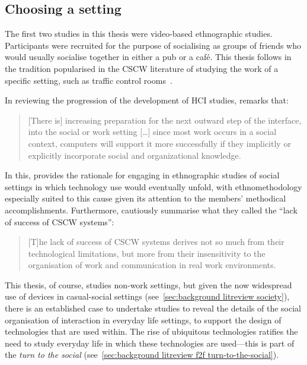 


\subsection{Choosing a setting}\label{sec:synopsis discussion method setting}
\begin{revisedsubmission}
The first two studies in this thesis were video-based ethnographic studies.
Participants were recruited for the purpose of socialising as groups of friends who would usually socialise together in either a pub or a caf\'{e}.
This thesis follows in the tradition popularised in the \ac{CSCW} literature of studying the work of a specific setting, such as traffic control rooms~\citep{Bentley1992}.

In reviewing the progression of the development of \ac{HCI} studies, \citet{Grudin1990} remarks that:

\begin{quote}
    [There is] increasing preparation for the next outward step of the interface, into the social or work setting [\ldots] since most work occurs in a social context, computers will support it more successfully if they implicitly or explicitly incorporate social and organizational knowledge.
\end{quote}
In this, \citet{Grudin1990} provides the rationale for engaging in ethnographic studies of social settings in which technology use would eventually unfold, with ethnomethodology especially suited to this cause given its attention to the members' methodical accomplishments.
Furthermore, \citet{Heath1994} cautiously summarise what they called the ``lack of success of \ac{CSCW} systems'':
\begin{quote}
    [T]he lack of success of \ac{CSCW} systems derives not so much from their technological limitations, but more from their insensitivity to the organisation of work and communication in real work environments.
\end{quote}
This thesis, of course, studies non-work settings, but given the now widespread use of devices in casual-social settings (see~\ref{sec:background litreview society}), there is an established case to undertake studies to reveal the details of the social organisation of interaction in everyday life settings, to support the design of technologies that are used within.
The rise of ubiquitous technologies ratifies the need to study everyday life in which these technologies are used—this is part of the \textit{turn to the social} (see~\ref{sec:background litreview f2f turn-to-the-social}).
\end{revisedsubmission}



